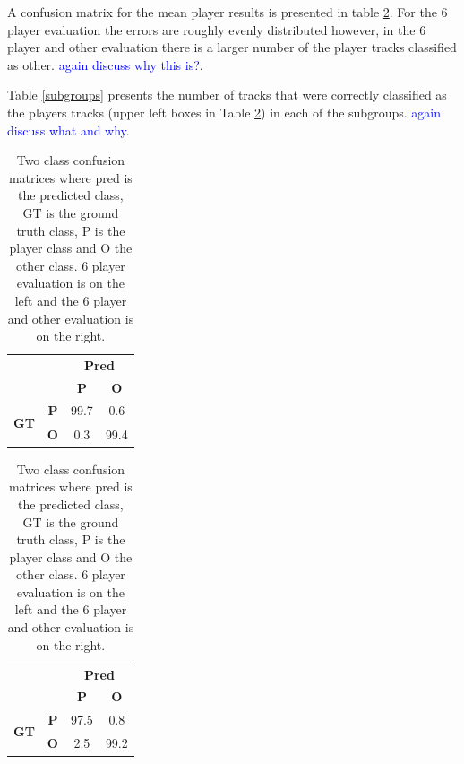 \documentclass{article}
\newcommand{\carl}[1]{\textcolor{blue}{#1}}
\begin{document}
{{{A confusion matrix for the mean player results is presented in table \ref{2classconf}. For the 6 player evaluation the errors are roughly evenly distributed however, in the 6 player and other evaluation there is a larger number of the player tracks classified as other. \carl{again discuss why this is?}.

Table \ref{subgroups} presents the number of tracks that were correctly classified as the players tracks (upper left boxes in Table \ref{2classconf}) in each of the subgroups. \carl{again discuss what and why}.

\begin{table}[h!]
    
    \begin{minipage}{.5\linewidth}
      \centering

\begin{tabular}{cc|c|c|}

\cline{3-4}
\multicolumn{1}{l}{}                                          & \multicolumn{1}{l|}{} & \multicolumn{2}{c|}{\textbf{Pred}}                              \\ \cline{3-4} 
\multicolumn{1}{l}{}                                          & \multicolumn{1}{l|}{} & \textbf{P} & \textbf{O}  \\ \hline
\multicolumn{1}{|c|}{\multirow{2}{*}{\begin{turn}{90}\textbf{GT}\end{turn}}} & \textbf{P}            & 99.7     & 0.6            \\ \cline{2-4} 
\multicolumn{1}{|c|}{}                                        & \textbf{O}            & 0.3          & 99.4            \\ \hline
\end{tabular}
    \end{minipage}%
    \begin{minipage}{.5\linewidth}
      \centering
\begin{tabular}{cc|c|c|}

\cline{3-4}
\multicolumn{1}{l}{}                                          & \multicolumn{1}{l|}{} & \multicolumn{2}{c|}{\textbf{Pred}}                              \\ \cline{3-4} 
\multicolumn{1}{l}{}                                          & \multicolumn{1}{l|}{} & \textbf{P} & \textbf{O}  \\ \hline
\multicolumn{1}{|c|}{\multirow{2}{*}{\begin{turn}{90}\textbf{GT}\end{turn}}} & \textbf{P}            & 97.5    & 0.8            \\ \cline{2-4} 
\multicolumn{1}{|c|}{}                                        & \textbf{O}            & 2.5          & 99.2            \\ \hline
\end{tabular}
    \end{minipage} 
 \caption{Two class confusion matrices where pred is the predicted class, GT is the ground truth class, P is the player class and O the other class. 6 player evaluation is on the left and the 6 player and other evaluation is on the right.}
 \label{2classconf}   
\end{table}


}}}
\end{document}
